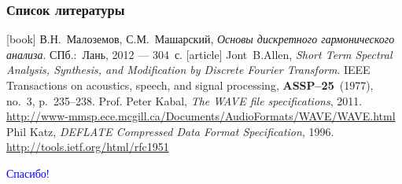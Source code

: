 \documentclass[notes=only]{beamer}
\begin{document}
  
\begin{frame}
 \frametitle{Список литературы}
 \begin{thebibliography}{9}    
  [book]
    В.Н.~Малоземов, С.М.~Машарский,
    {\em Основы дискретного гармонического анализа}.
    \newblock СПб.:~Лань, 2012 --- 304~с.
  [article]
    Jont~B.Allen,
    {\em Short Term Spectral Analysis, Synthesis, and Modification by Discrete Fourier Transform}.
    \newblock IEEE Transactions on acoustics, speech, and signal processing, \textbf{ASSP--25}~(1977), no.~3, p.~235--238.
    Prof. Peter Kabal,
    {\em The WAVE file specifications}, 2011.
    \newblock \url{http://www-mmsp.ece.mcgill.ca/Documents/AudioFormats/WAVE/WAVE.html}
    Phil Katz,
    {\em DEFLATE Compressed Data Format Specification}, 1996.
    \newblock \url{http://tools.ietf.org/html/rfc1951}
  \end{thebibliography}
\end{frame}
    
  
\begin{frame}[c]
\begin{center}
{\Large \textcolor{blue}{Спасибо!}}
\end{center}
\end{frame}
    

    
\end{document}
